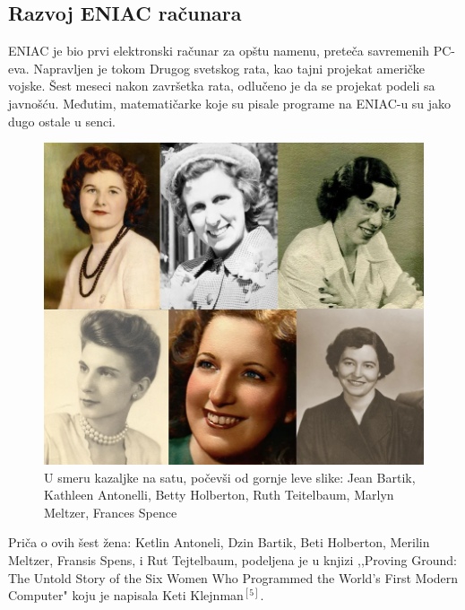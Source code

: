 \documentclass[12pt]{article}
\begin{document}
\subsection{Razvoj ENIAC računara}
\begin{text}
ENIAC je bio prvi elektronski računar za opštu namenu, preteča savremenih PC-eva. Napravljen je tokom Drugog svetskog rata, kao tajni projekat američke vojske. Šest meseci nakon završetka rata, odlučeno je da se projekat podeli sa javnošću. Međutim, matematičarke koje su pisale programe na ENIAC-u su jako dugo ostale u senci. 

\begin{figure}[htp]
    \centering
    \includegraphics[width=0.9\linewidth]{eniacwomen.png}
    \caption{U smeru kazaljke na satu, počevši od gornje leve slike: Jean Bartik, Kathleen Antonelli, Betty Holberton, Ruth Teitelbaum, Marlyn Meltzer, Frances Spence}
\end{figure}

Priča o ovih šest žena: Ketlin Antoneli, Dzin Bartik, Beti Holberton, Merilin Meltzer, Fransis Spens, i Rut Tejtelbaum, podeljena je u knjizi ,,Proving Ground: The Untold Story of the Six Women Who Programmed the World’s First Modern Computer" koju je napisala Keti Klejnman$^{[5]}$. 
\end{text}
\end{document}
